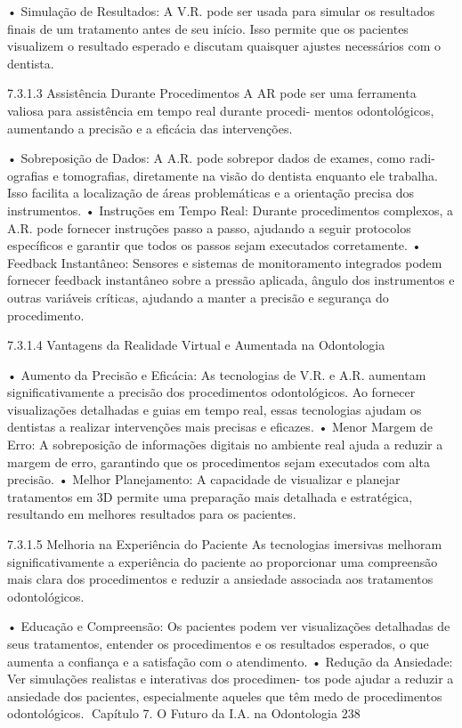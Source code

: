     • Simulação de Resultados: A V.R. pode ser usada para simular os resultados
      finais de um tratamento antes de seu início. Isso permite que os pacientes
      visualizem o resultado esperado e discutam quaisquer ajustes necessários com o
      dentista.

7.3.1.3   Assistência Durante Procedimentos
A AR pode ser uma ferramenta valiosa para assistência em tempo real durante procedi-
mentos odontológicos, aumentando a precisão e a eficácia das intervenções.

    • Sobreposição de Dados: A A.R. pode sobrepor dados de exames, como radi-
      ografias e tomografias, diretamente na visão do dentista enquanto ele trabalha.
      Isso facilita a localização de áreas problemáticas e a orientação precisa dos
      instrumentos.
    • Instruções em Tempo Real: Durante procedimentos complexos, a A.R. pode
      fornecer instruções passo a passo, ajudando a seguir protocolos específicos e
      garantir que todos os passos sejam executados corretamente.
    • Feedback Instantâneo: Sensores e sistemas de monitoramento integrados
      podem fornecer feedback instantâneo sobre a pressão aplicada, ângulo dos
      instrumentos e outras variáveis críticas, ajudando a manter a precisão e segurança
      do procedimento.

7.3.1.4   Vantagens da Realidade Virtual e Aumentada na Odontologia

    • Aumento da Precisão e Eficácia: As tecnologias de V.R. e A.R. aumentam
      significativamente a precisão dos procedimentos odontológicos. Ao fornecer
      visualizações detalhadas e guias em tempo real, essas tecnologias ajudam os
      dentistas a realizar intervenções mais precisas e eficazes.
    • Menor Margem de Erro: A sobreposição de informações digitais no ambiente
      real ajuda a reduzir a margem de erro, garantindo que os procedimentos sejam
      executados com alta precisão.
    • Melhor Planejamento: A capacidade de visualizar e planejar tratamentos em 3D
      permite uma preparação mais detalhada e estratégica, resultando em melhores
      resultados para os pacientes.

7.3.1.5   Melhoria na Experiência do Paciente
As tecnologias imersivas melhoram significativamente a experiência do paciente ao
proporcionar uma compreensão mais clara dos procedimentos e reduzir a ansiedade
associada aos tratamentos odontológicos.

    • Educação e Compreensão: Os pacientes podem ver visualizações detalhadas
      de seus tratamentos, entender os procedimentos e os resultados esperados, o
      que aumenta a confiança e a satisfação com o atendimento.
    • Redução da Ansiedade: Ver simulações realistas e interativas dos procedimen-
      tos pode ajudar a reduzir a ansiedade dos pacientes, especialmente aqueles que
      têm medo de procedimentos odontológicos.
Capítulo 7. O Futuro da I.A. na Odontologia                                        238


